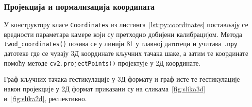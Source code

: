 \documentclass[master]{finthesis}
\begin{document}
\subsubsection{Пројекција и нормализација координата}

У конструктору класе \verb|Coordinates| из листинга~\ref{lst:py:coordinates} постављају се вредности параметара камере који су претходно добијени калибрацијом. Метода \verb |twod_coordinates()| позива се у линији 81 у главној датотеци и учитава \texttt{.npy} датотеке где се чувају 3Д координате кључних тачака шаке, а затим те координате помоћу методе \lstinline|cv2.projectPoints()| 
пројектује у 2Д координате.

Граф кључних тачака гестикулације у 3Д формату и граф исте те гестикулације након пројекције у 2Д формат приказани су на сликама~\ref{fig:slika3d} и~\ref{fig:slika2d}, респективно.
\end{document}
